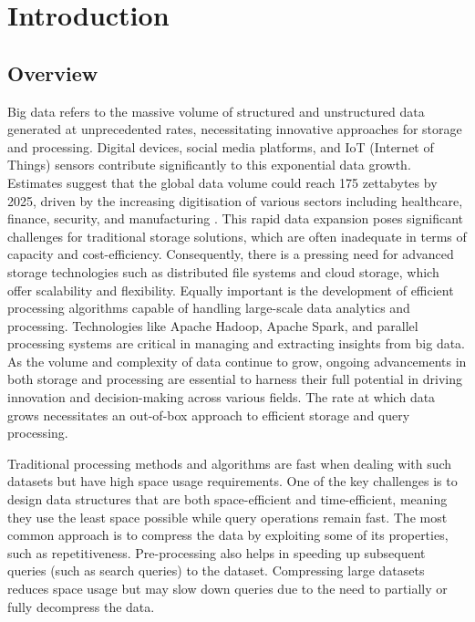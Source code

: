 \chapter{Introduction}
\section{Overview}
Big data refers to the massive volume of structured and unstructured data generated at unprecedented rates, necessitating innovative approaches for storage and processing. Digital devices, social media platforms, and IoT (Internet of Things) sensors contribute significantly to this exponential data growth. Estimates suggest that the global data volume could reach 175 zettabytes by 2025, driven by the increasing digitisation of various sectors including healthcare, finance, security, and manufacturing \cite{Coughlin_2018}. This rapid data expansion poses significant challenges for traditional storage solutions, which are often inadequate in terms of capacity and cost-efficiency. Consequently, there is a pressing need for advanced storage technologies such as distributed file systems and cloud storage, which offer scalability and flexibility. Equally important is the development of efficient processing algorithms capable of handling large-scale data analytics and processing. Technologies like Apache Hadoop, Apache Spark, and parallel processing systems are critical in managing and extracting insights from big data. As the volume and complexity of data continue to grow, ongoing advancements in both storage and processing are essential to harness their full potential in driving innovation and decision-making across various fields. The rate at which data grows necessitates an out-of-box approach to efficient storage and query processing.

Traditional processing methods and algorithms are fast when dealing with such datasets but have high space usage requirements. One of the key challenges is to design data structures that are both space-efficient and time-efficient, meaning they use the least space possible while query operations remain fast. The most common approach is to compress the data by exploiting some of its properties, such as repetitiveness. Pre-processing also helps in speeding up subsequent queries (such as search queries) to the dataset. Compressing large datasets reduces space usage but may slow down queries due to the need to partially or fully decompress the data.

